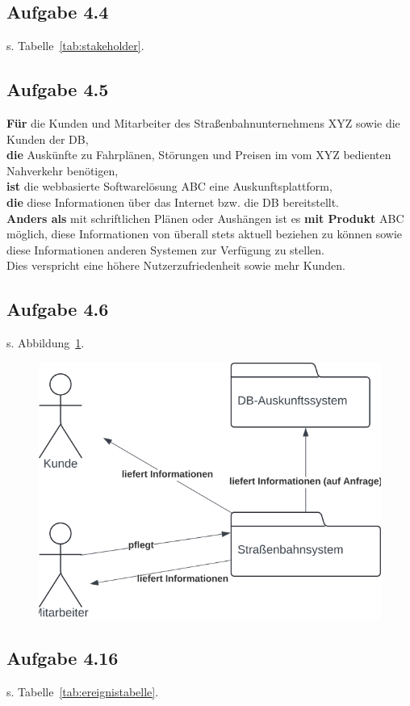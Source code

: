 \subsection{Aufgabe 4.4}
s. Tabelle~\ref{tab:stakeholder}.

\subsection{Aufgabe 4.5}
\textbf{Für} die Kunden und Mitarbeiter des Straßenbahnunternehmens XYZ sowie die Kunden der DB, \\
\textbf{die} Auskünfte zu Fahrplänen, Störungen und Preisen im vom XYZ bedienten Nahverkehr benötigen,\\
\textbf{ist} die webbasierte Softwarelösung ABC eine Auskunftsplattform,\\
\textbf{die} diese Informationen über das Internet bzw. die DB bereitstellt.\\
\textbf{Anders als} mit schriftlichen Plänen oder Aushängen ist es \textbf{mit Produkt} ABC möglich, diese Informationen von überall stets aktuell beziehen zu können sowie diese Informationen anderen Systemen zur Verfügung zu stellen.\\
Dies verspricht eine höhere Nutzerzufriedenheit sowie mehr Kunden.


\subsection{Aufgabe 4.6}

s. Abbildung~\ref{fig:aufgabe4-6}.

\begin{figure}
    \centering
    \includegraphics[scale=0.35]{chapters/Requirements Engineering/img/aufgabe4.6}
    \caption{}
    \label{fig:aufgabe4-6}
\end{figure}

\subsection{Aufgabe 4.16}

s. Tabelle~\ref{tab:ereignistabelle}.

